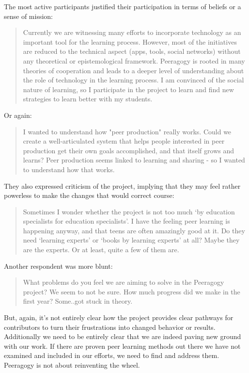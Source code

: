 \documentclass{acm_proc_article-sp}
\begin{document}
The most active participants justified their participation in terms of
beliefs or a sense of mission:

\begin{quote}
Currently we are witnessing many efforts to incorporate technology as
an important tool for the learning process. However, most of the
initiatives are reduced to the technical aspect (apps, tools, social
networks) without any theoretical or epistemological
framework. Peeragogy is rooted in many theories of cooperation and
leads to a deeper level of understanding about the role of technology
in the learning process. I am convinced of the social nature of
learning, so I participate in the project to learn and find new
strategies to learn better with my students.
\end{quote}

Or again:

\begin{quote}
I wanted to understand how "peer production" really works. Could we
create a well-articulated system that helps people interested in peer
production get their own goals accomplished, and that itself grows and
learns? Peer production seems linked to learning and sharing - so I
wanted to understand how that works.
\end{quote}

They also expressed criticism of the project, implying that they may feel rather powerless to make the changes that would correct course:

\begin{quote}
Sometimes I wonder whether the project is not too much `by education specialists for education specialists'. I have the feeling peer learning is happening anyway, and that teens are often amazingly good at it. Do they need `learning experts' or `books by learning experts' at all? Maybe they are the experts. Or at least, quite a few of them are.
\end{quote}

Another respondent was more blunt:

\begin{quote}
What problems do you feel we are aiming to solve in the Peeragogy
project? We seem to not be sure. How much progress did we make in the
first year? Some..got stuck in theory.
\end{quote}

But, again, it's not entirely clear how the project provides clear pathways for contributors to turn their frustrations into changed behavior or results. Additionally we need to be entirely clear that we are indeed paving new ground with our work. If there are proven peer learning methods out there we have not examined and included in our efforts, we need to find and address them. Peeragogy is not about reinventing the wheel.
\end{document}
